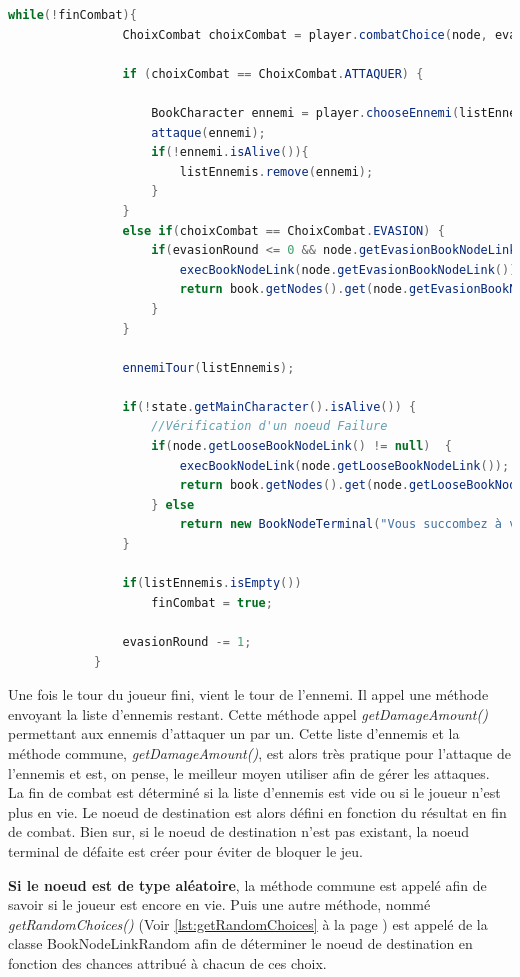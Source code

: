 		\begin{lstlisting}[gobble=12, language=java, caption=JeuCombat]
			while(!finCombat){
				ChoixCombat choixCombat = player.combatChoice(node, evasionRound, state);

				if (choixCombat == ChoixCombat.ATTAQUER) {

					BookCharacter ennemi = player.chooseEnnemi(listEnnemis);
					attaque(ennemi);
					if(!ennemi.isAlive()){
						listEnnemis.remove(ennemi);
					}
				}
				else if(choixCombat == ChoixCombat.EVASION) {
					if(evasionRound <= 0 && node.getEvasionBookNodeLink() != null){
						execBookNodeLink(node.getEvasionBookNodeLink());
						return book.getNodes().get(node.getEvasionBookNodeLink().getDestination());
					}
				}

				ennemiTour(listEnnemis);

				if(!state.getMainCharacter().isAlive()) {
					//Vérification d'un noeud Failure
					if(node.getLooseBookNodeLink() != null)  {
						execBookNodeLink(node.getLooseBookNodeLink());
						return book.getNodes().get(node.getLooseBookNodeLink().getDestination());
					} else
						return new BookNodeTerminal("Vous succombez à vos blessures", BookNodeStatus.FAILURE);
				}

				if(listEnnemis.isEmpty())
					finCombat = true;

				evasionRound -= 1;
			}
		\end{lstlisting}

		Une fois le tour du joueur fini, vient le tour de l'ennemi. Il appel une méthode envoyant la liste d'ennemis restant. Cette méthode appel \textit{getDamageAmount()} permettant aux ennemis d'attaquer un par un. Cette liste d'ennemis et la méthode commune, \textit{getDamageAmount()}, est alors très pratique pour l'attaque de l'ennemis et est, on pense, le meilleur moyen utiliser afin de gérer les attaques.\\

		La fin de combat est déterminé si la liste d'ennemis est vide ou si le joueur n'est plus en vie. Le noeud de destination est alors défini en fonction du résultat en fin de combat. Bien sur, si le noeud de destination n'est pas existant, la noeud terminal de défaite est créer pour éviter de bloquer le jeu.

		\textbf{Si le noeud est de type aléatoire}, la méthode commune est appelé afin de savoir si le joueur est encore en vie. Puis une autre méthode, nommé \textit{getRandomChoices()} (Voir \ref{lst:getRandomChoices} à la page \pageref{lst:getRandomChoices}) est appelé de la classe BookNodeLinkRandom afin de déterminer le noeud de destination en fonction des chances attribué à chacun de ces choix.


